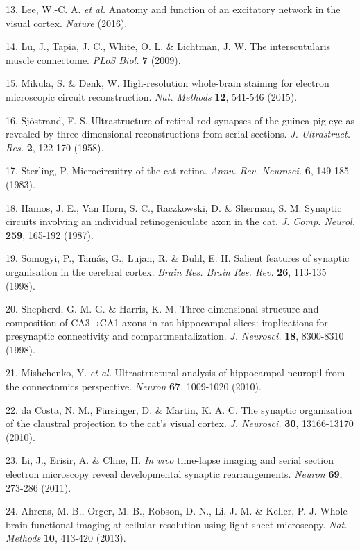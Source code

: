 \documentclass{article}
\begin{document}
\begin{hangpars}
13. Lee, W.-C. A.\textit{ et al.} Anatomy and function of an excitatory network in the visual cortex. \textit{Nature} (2016).

14. Lu, J., Tapia, J. C., White, O. L. \& Lichtman, J. W. The interscutularis muscle connectome. \textit{PLoS Biol.} \textbf{7} (2009).

15. Mikula, S. \& Denk, W. High-resolution whole-brain staining for electron microscopic circuit reconstruction. \textit{Nat. Methods} \textbf{12}, 541-546 (2015).

16. Sjöstrand, F. S. Ultrastructure of retinal rod synapses of the guinea pig eye as revealed by three-dimensional reconstructions from serial sections. \textit{J. Ultrastruct. Res.} \textbf{2}, 122-170 (1958).

17. Sterling, P. Microcircuitry of the cat retina. \textit{Annu. Rev. Neurosci.} \textbf{6}, 149-185 (1983).

18. Hamos, J. E., Van Horn, S. C., Raczkowski, D. \& Sherman, S. M. Synaptic circuits involving an individual retinogeniculate axon in the cat. \textit{J. Comp. Neurol.} \textbf{259}, 165-192 (1987).

19. Somogyi, P., Tamás, G., Lujan, R. \& Buhl, E. H. Salient features of synaptic organisation in the cerebral cortex. \textit{Brain Res. Brain Res. Rev.} \textbf{26}, 113-135 (1998).

20. Shepherd, G. M. G. \& Harris, K. M. Three-dimensional structure and composition of CA3→CA1 axons in rat hippocampal slices: implications for presynaptic connectivity and compartmentalization. \textit{J. Neurosci.} \textbf{18}, 8300-8310 (1998).

21. Mishchenko, Y.\textit{ et al.} Ultrastructural analysis of hippocampal neuropil from the connectomics perspective. \textit{Neuron} \textbf{67}, 1009-1020 (2010).


22. da Costa, N. M., Fürsinger, D. \& Martin, K. A. C. The synaptic organization of the claustral projection to the cat's visual cortex. \textit{J. Neurosci.} \textbf{30}, 13166-13170 (2010).

23. Li, J., Erisir, A. \& Cline, H. \textit{In vivo} time-lapse imaging and serial section electron microscopy reveal developmental synaptic rearrangements. \textit{Neuron} \textbf{69}, 273-286 (2011).

24. Ahrens, M. B., Orger, M. B., Robson, D. N., Li, J. M. \& Keller, P. J. Whole-brain functional imaging at cellular resolution using light-sheet microscopy. \textit{Nat. Methods} \textbf{10}, 413-420 (2013).


\end{hangpars}
\end{document}
